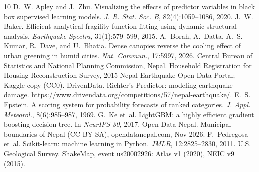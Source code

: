 \documentclass{article}
\begin{document}
\begin{thebibliography}{10}
\setlength{\itemsep}{0pt}
D.~W. Apley and J.~Zhu. Visualizing the effects of predictor variables in black box supervised learning models.
\emph{J. R. Stat. Soc. B}, 82(4):1059--1086, 2020.
J.~W. Baker. Efficient analytical fragility function fitting using dynamic structural analysis.
\emph{Earthquake Spectra}, 31(1):579--599, 2015.
A.~Borah, A.~Datta, A.~S. Kumar, R.~Dave, and U.~Bhatia. Dense canopies reverse the cooling effect of urban
greening in humid cities. \emph{Nat. Commun.}, 17:5997, 2026.
Central Bureau of Statistics and National Planning Commission, Nepal. Household Registration for Housing
Reconstruction Survey, 2015 Nepal Earthquake Open Data Portal; Kaggle copy (CC0).
DrivenData. Richter's Predictor: modeling earthquake damage.
\url{https://www.drivendata.org/competitions/57/nepal-earthquake/}.
E.~S. Epstein. A scoring system for probability forecasts of ranked categories.
\emph{J. Appl. Meteorol.}, 8(6):985--987, 1969.
G.~Ke et~al. LightGBM: a highly efficient gradient boosting decision tree. In \emph{NeurIPS 30}, 2017.
Open Data Nepal. Municipal boundaries of Nepal (CC BY-SA), opendatanepal.com, Nov 2026.
F.~Pedregosa et~al. Scikit-learn: machine learning in Python. \emph{JMLR}, 12:2825--2830, 2011.
U.S. Geological Survey. ShakeMap, event us20002926: Atlas v1 (2020), NEIC v9 (2015).
\end{thebibliography}
\end{document}
